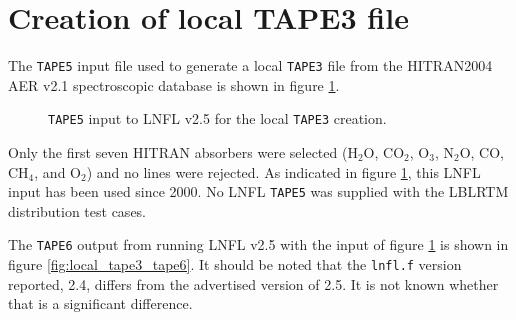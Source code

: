 \section{Creation of local TAPE3 file}
\label{sec:local_tape3}
The \texttt{TAPE5} input file used to generate a local \texttt{TAPE3} file from the HITRAN2004 AER v2.1 spectroscopic database is shown in figure \ref{fig:local_tape3_tape5}.

\begin{figure}[htp]
  \centering
  \caption{\texttt{TAPE5} input to LNFL v2.5 for the local \texttt{TAPE3} creation.}
  \label{fig:local_tape3_tape5}
\end{figure}

Only the first seven HITRAN absorbers were selected (H$_2$O, CO$_2$, O$_3$, N$_2$O, CO, CH$_4$, and O$_2$) and no lines were rejected. As indicated in figure \ref{fig:local_tape3_tape5}, this LNFL input has been used since 2000. No LNFL \texttt{TAPE5} was supplied with the LBLRTM distribution test cases.

The \texttt{TAPE6} output from running LNFL v2.5 with the input of figure \ref{fig:local_tape3_tape5} is shown in figure \ref{fig:local_tape3_tape6}. It should be noted that the \texttt{lnfl.f} version reported, 2.4, differs from the advertised version of 2.5. It is not known whether that is a significant difference.

